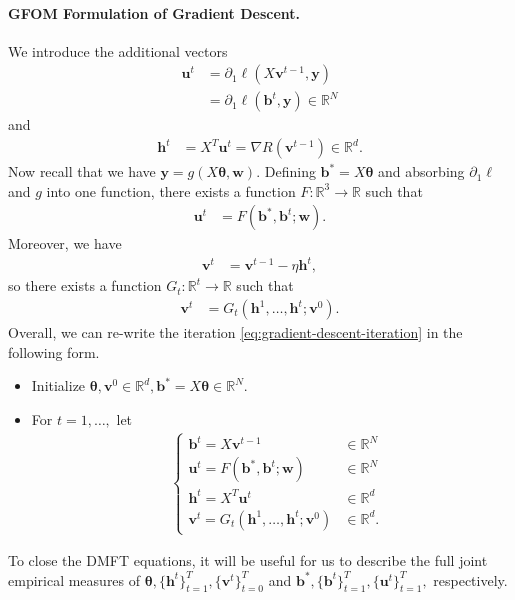 \documentclass{article}
\newcommand{\1}{\mathbbm{1}}
\theoremstyle{plain}
\theoremstyle{definition}
\theoremstyle{remark}
\newcommand{\bfu}{\boldsymbol{u}}
\newcommand{\bfy}{\boldsymbol{y}}
\newcommand{\bfv}{\boldsymbol{v}}
\newcommand{\bfh}{\boldsymbol{h}}
\newcommand{\bfb}{\boldsymbol{b}}
\newcommand{\bftheta}{\boldsymbol{\theta}}
\newcommand{\bfw}{\boldsymbol{w}}
\newcommand{\R}{\mathbb{R}}
\begin{document}
\paragraph{GFOM Formulation of Gradient Descent.} We introduce the additional vectors
\begin{align*}
    \bfu^t &= \partial_1 \ell(X\bfv^{t-1}, \bfy) \\
    &= \partial_1 \ell(\bfb^t, \bfy)  \in \R^N
\end{align*}
and
\begin{align*}
    \bfh^t &= X^T \bfu^t =\nabla R(\bfv^{t-1})\in \R^d.
\end{align*}
Now recall that we have $\bfy = g(X\bftheta,\bfw).$ Defining $\bfb^* = X\bftheta$ and absorbing $\partial_1\ell$ and $g$ into one function, there exists a function $F:\R^3 \to\R$ such that
\begin{align*}
    \bfu^t &= F(\bfb^*, \bfb^t; \bfw).
\end{align*}
Moreover, we have
\begin{align*}
    \bfv^t &= \bfv^{t-1} - \eta \bfh^t,
\end{align*}
so there exists a function $G_t:\R^t\to\R$ such that
\begin{align*}
    \bfv^t &= G_t(\bfh^1,\dots,\bfh^t;\bfv^0).
\end{align*}
Overall, we can re-write the iteration \eqref{eq:gradient-descent-iteration} in the following form.
\begin{itemize}
    \item Initialize $\bftheta,\bfv^0 \in \R^d,\bfb^* = X\bftheta \in \R^N.$
    \item For $t=1,\dots,$ let
    \begin{align}\label{eq:GD-iteration}
    &
    \begin{cases}
        \bfb^t = X\bfv^{t-1} &\in \R^N \\
        \bfu^t = F(\bfb^*,\bfb^t;\bfw) &\in \R^N \\
        \bfh^t = X^T \bfu^t &\in \R^d\\
        \bfv^t =G_t(\bfh^1,\dots,\bfh^t;\bfv^0) &\in \R^d.
    \end{cases}
    \end{align}
\end{itemize}
To close the DMFT equations, it will be useful for us to describe the full joint empirical measures of $\bftheta, \{\bfh^t\}_{t=1}^T, \{\bfv^t\}_{t=0}^T$ and $\bfb^*,\{\bfb^t\}_{t=1}^T, \{\bfu^t\}_{t=1}^T,$ respectively.
\end{document}
